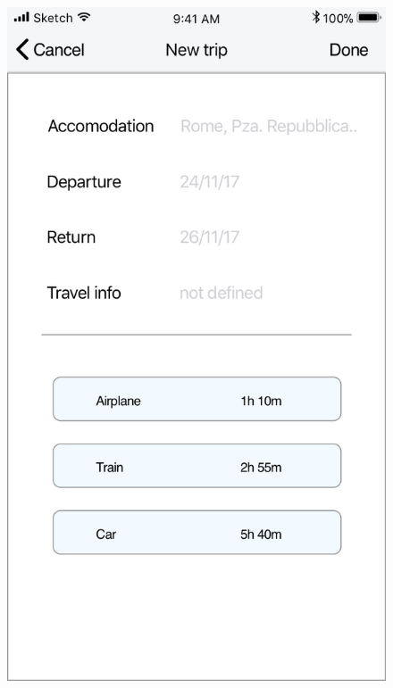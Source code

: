 \begin{enumerate}
			\begin{figure}[H]
				\centering
				\includegraphics[scale=0.25]{Images/Sketch/Trip_1}
				\hspace{0.5cm}

\end{figure}
\end{enumerate}
